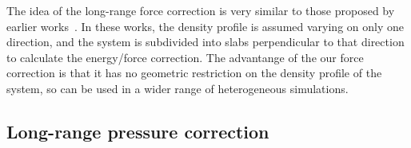\documentclass[aps,pre,preprint]{revtex4-1}
\renewcommand{\v}[1]{\textbf{\textit{#1}}}
\begin{document}
The idea of the long-range force correction is very similar to those
proposed by earlier works~\cite{guo1997long, mecke1997molecular,
  janecek2006long, shen2007comparative}. In these works, the density
profile is assumed varying on only one direction, and the system is
subdivided into slabs perpendicular to that direction to calculate the
energy/force correction. The advantange of the our force correction is
that it has no geometric restriction on the density profile of the
system, so can be used in a wider range of heterogeneous simulations.





\subsection{Long-range pressure correction}

\end{document}
